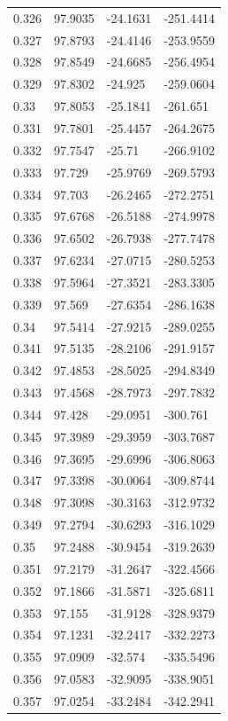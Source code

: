 \begin{tabular}{llll}
0.326 & 97.9035 & -24.1631 & -251.4414 \\
0.327 & 97.8793 & -24.4146 & -253.9559 \\
0.328 & 97.8549 & -24.6685 & -256.4954 \\
0.329 & 97.8302 & -24.925 & -259.0604 \\
0.33 & 97.8053 & -25.1841 & -261.651 \\
0.331 & 97.7801 & -25.4457 & -264.2675 \\
0.332 & 97.7547 & -25.71 & -266.9102 \\
0.333 & 97.729 & -25.9769 & -269.5793 \\
0.334 & 97.703 & -26.2465 & -272.2751 \\
0.335 & 97.6768 & -26.5188 & -274.9978 \\
0.336 & 97.6502 & -26.7938 & -277.7478 \\
0.337 & 97.6234 & -27.0715 & -280.5253 \\
0.338 & 97.5964 & -27.3521 & -283.3305 \\
0.339 & 97.569 & -27.6354 & -286.1638 \\
0.34 & 97.5414 & -27.9215 & -289.0255 \\
0.341 & 97.5135 & -28.2106 & -291.9157 \\
0.342 & 97.4853 & -28.5025 & -294.8349 \\
0.343 & 97.4568 & -28.7973 & -297.7832 \\
0.344 & 97.428 & -29.0951 & -300.761 \\
0.345 & 97.3989 & -29.3959 & -303.7687 \\
0.346 & 97.3695 & -29.6996 & -306.8063 \\
0.347 & 97.3398 & -30.0064 & -309.8744 \\
0.348 & 97.3098 & -30.3163 & -312.9732 \\
0.349 & 97.2794 & -30.6293 & -316.1029 \\
0.35 & 97.2488 & -30.9454 & -319.2639 \\
0.351 & 97.2179 & -31.2647 & -322.4566 \\
0.352 & 97.1866 & -31.5871 & -325.6811 \\
0.353 & 97.155 & -31.9128 & -328.9379 \\
0.354 & 97.1231 & -32.2417 & -332.2273 \\
0.355 & 97.0909 & -32.574 & -335.5496 \\
0.356 & 97.0583 & -32.9095 & -338.9051 \\
0.357 & 97.0254 & -33.2484 & -342.2941 \\

\end{tabular}
